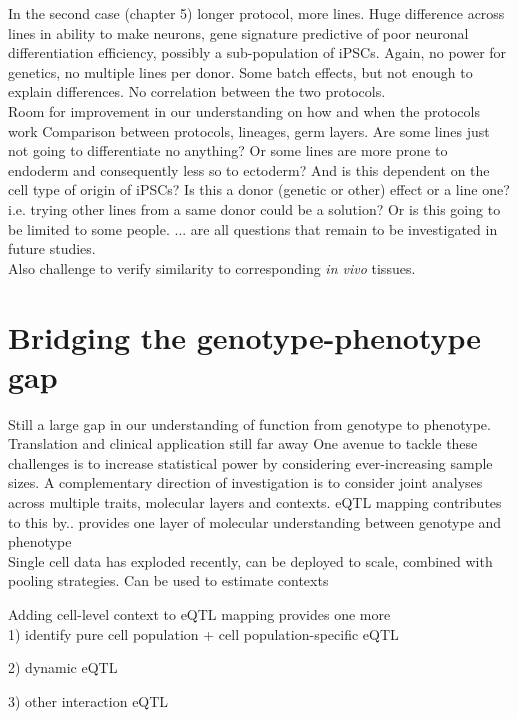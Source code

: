 In the second case (chapter 5) longer protocol, more lines.
Huge difference across lines in ability to make neurons, gene signature predictive of poor neuronal differentiation efficiency, possibly a sub-population of iPSCs.
Again, no power for genetics, no multiple lines per donor.
Some batch effects, but not enough to explain differences.
No correlation between the two protocols. \\

Room for improvement in our understanding on how and when the protocols work
Comparison between protocols, lineages, germ layers.
Are some lines just not going to differentiate no anything?
Or some lines are more prone to endoderm and consequently less so to ectoderm?
And is this dependent on the cell type of origin of iPSCs?
Is this a donor (genetic or other) effect or a line one?
i.e. trying other lines from a same donor could be a solution?
Or is this going to be limited to some people.
... are all questions that remain to be investigated in future studies.\\

Also challenge to verify similarity to corresponding \textit{in vivo} tissues.

\section{Bridging the genotype-phenotype gap}

Still a large gap in our understanding of function from genotype to phenotype.
Translation and clinical application still far away
One avenue to tackle these challenges is to increase statistical power by considering ever-increasing sample sizes. 
A complementary direction of investigation is to consider joint analyses across multiple traits, molecular layers and contexts.
eQTL mapping contributes to this by.. provides one layer of molecular understanding between genotype and phenotype \\

Single cell data has exploded recently, 
can be deployed to scale, combined with pooling strategies.
Can be used to estimate contexts

Adding cell-level context to eQTL mapping provides one more\\

1) identify pure cell population + cell population-specific eQTL

2) dynamic eQTL

3) other interaction eQTL

